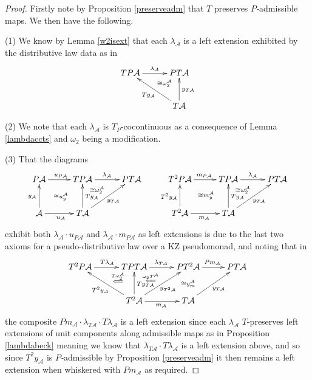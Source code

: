 \documentclass[a4paper,oneside,english]{amsart}
\numberwithin{equation}{section}
\numberwithin{figure}{section}
\theoremstyle{plain}
\theoremstyle{definition}
\theoremstyle{remark}
\theoremstyle{definition}
\theoremstyle{plain}
\theoremstyle{plain}
\theoremstyle{plain}
\begin{document}
\begin{proof}
Firstly note by Proposition \ref{preserveadm} that $T$ preserves
\emph{$P$-}admissible maps. We then have the following.

(1) We know by Lemma \ref{w2isext} that each $\lambda_{\mathcal{A}}$
is a left extension exhibited by the distributive law data as in 
\[
\xymatrix@=1em{TP\mathcal{A}\ar[rr]^{\lambda_{\mathcal{A}}} &  & PT\mathcal{A}\ar@{}[dl]|-{\cong\omega_{2}^{\mathcal{A}}}\\
 & \;\\
 &  & T\mathcal{A}\ar[uu]_{y_{T\mathcal{A}}}\ar[uull]^{Ty_{\mathcal{A}}}
}
\]

(2) We note that each $\lambda_{\mathcal{A}}$ is $T_{P}$-cocontinuous
as a consequence of Lemma \ref{lambdaccts} and $\omega_{2}$ being
a modification.

(3) That the diagrams
\[
\xymatrix@=1em{P\mathcal{A}\ar[rr]^{u_{P\mathcal{A}}} &  & TP\mathcal{A}\ar@{}[dldl]|-{\cong u_{y}^{\mathcal{A}}}\ar[rr]^{\lambda_{\mathcal{A}}}\ar@{}[dr]|-{\cong\omega_{2}^{\mathcal{A}}} &  & PT\mathcal{A} &  & T^{2}P\mathcal{A}\ar[rr]^{m_{P\mathcal{A}}} &  & TP\mathcal{A}\ar@{}[dldl]|-{\cong m_{y}^{\mathcal{A}}}\ar[rr]^{\lambda_{\mathcal{A}}}\ar@{}[dr]|-{\cong\omega_{2}^{\mathcal{A}}} &  & PT\mathcal{A}\\
 &  &  & \; &  &  &  &  &  & \;\\
\mathcal{A}\ar[rr]_{u_{\mathcal{A}}}\ar[uu]^{y_{\mathcal{A}}} &  & T\mathcal{A}\ar[uu]_{Ty_{\mathcal{A}}}\ar[uurr]_{y_{T\mathcal{A}}} &  &  &  & T^{2}\mathcal{A}\ar[rr]_{m_{\mathcal{A}}}\ar[uu]^{T^{2}y_{\mathcal{A}}} &  & T\mathcal{A}\ar[uu]_{Ty_{\mathcal{A}}}\ar[uurr]_{y_{T\mathcal{A}}}
}
\]
exhibit both $\lambda_{\mathcal{A}}\cdot u_{P\mathcal{A}}$ and $\lambda_{\mathcal{A}}\cdot m_{P\mathcal{A}}$
as left extensions is due to the last two axioms for a pseudo-distributive
law over a KZ pseudomonad, and noting that in 
\[
\xymatrix@=1em{T^{2}P\mathcal{A}\ar[rr]^{T\lambda_{\mathcal{A}}} &  & TPT\mathcal{A}\ar@{}[dl]|-{\stackrel{T\omega_{2}^{\mathcal{A}}}{\Longleftarrow}}\ar[rr]^{\lambda_{T\mathcal{A}}}\ar@{}[dr]|-{\stackrel{\omega_{2}T^{\mathcal{A}}}{\Longleftarrow}} &  & PT^{2}\mathcal{A}\ar[rr]^{Pm_{\mathcal{A}}}\ar@{}[dd]|-{\cong y_{m}^{\mathcal{A}}} &  & PT\mathcal{A}\\
 & \; &  & \;\\
 &  & T^{2}\mathcal{A}\ar[uu]_{Ty_{T\mathcal{A}}}\ar[uull]^{T^{2}y_{\mathcal{A}}}\ar[uurr]_{y_{T^{2}\mathcal{A}}}\ar[rr]_{m_{\mathcal{A}}} &  & T\mathcal{A}\ar[uurr]_{y_{T\mathcal{A}}}
}
\]
the composite $Pm_{\mathcal{A}}\cdot\lambda_{T\mathcal{A}}\cdot T\lambda_{\mathcal{A}}$
is a left extension since each $\lambda_{\mathcal{A}}$ $T$-preserves
left extensions of unit components along admissible maps as in Proposition
\ref{lambdabeck} meaning we know that $\lambda_{T\mathcal{A}}\cdot T\lambda_{\mathcal{A}}$
is a left extension above, and so since $T^{2}y_{\mathcal{A}}$ is
\emph{$P$-}admissible by Proposition \ref{preserveadm} it then remains
a left extension when whiskered with $Pm_{\mathcal{A}}$ as required.
\end{proof}
\end{document}
